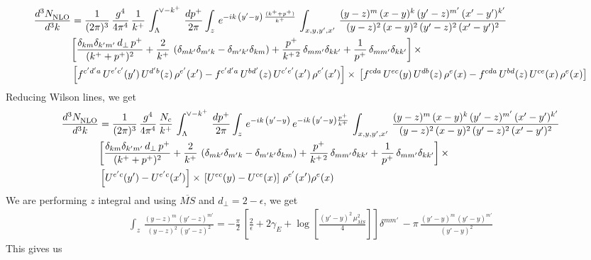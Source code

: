 \documentclass[10pt]{article}
\begin{document}
\begin{align}
     \frac{d^{3}N_{\rm NLO}^{\rm}}{d^{3}k}  & = \frac{1}{(2\pi)^{3}}\,\frac{g^{4}}{4\pi^{4}}\,\frac{1}{k^{+}}\,\int_{\Lambda}^{\vee-k^{+}}\, \frac{dp^{+}}{2\pi}\int_{z}\,e^{-ik\,\left(y'-y\right)\, \frac{(k^{+}+p^{+})}{k^{+}}}\,\int_{x,y,y^{\prime},x'}\,\frac{(y-z)^{m}\,(x-y)^{k}\,(y'-z)^{m'}\,(x'-y')^{k'}}{(y-z)^{2}\,(x-y)^{2}\,(y'-z)^{2}\,(x'-y')^{2}}\notag \\ &  \bigg[\frac{\delta_{km}\delta_{k'm'}\,d_{\perp}\,p^{+}}{(k^{+}+p^{+})^{2}}+\frac{2}{k^{+}}\,\left(\delta_{mk'}\delta_{m'k}-\delta_{m'k'}\delta_{km}\right) + \frac{p^{+}}{k^{+\,2}}\,\delta_{mm'}\delta_{kk'}+\frac{1}{p^{+}}\,\delta_{mm'}\delta_{kk'}\bigg]\,\times\,\notag \\ & \left[f^{c'd'a}\,U^{e'c'}(y')\,U^{d'b}(z)\,\rho^{e'}(x')-f^{c'd'a}\, 
    U^{bd'}(z)\,U^{c'e'}(x')\,\rho^{e'}(x')\right]\times\, \left[f^{cda}\,U^{ec}(y)\,U^{db}(z)\,\rho^{e}(x)-f^{cda}\, 
    U^{bd}(z)\,U^{ce}(x)\,\rho^{e}(x)\right]
\end{align}
Reducing Wilson lines, we get
\begin{align}
     \frac{d^{3}N_{\rm NLO}^{\rm}}{d^{3}k}  & = \frac{1}{(2\pi)^{3}}\,\frac{g^{4}}{4\pi^{4}}\,\frac{N_{c}}{k^{+}}\,\int_{\Lambda}^{\vee-k^{+}}\, \frac{dp^{+}}{2\pi}\int_{z}\,e^{-ik\,\left(y'-y\right)}\,e^{-ik\,\left(y'-y\right)\frac{p^{+}}{k^{+}}}\,\int_{x,y,y^{\prime},x'}\,\frac{(y-z)^{m}\,(x-y)^{k}\,(y'-z)^{m'}\,(x'-y')^{k'}}{(y-z)^{2}\,(x-y)^{2}\,(y'-z)^{2}\,(x'-y')^{2}}\notag \\ &  \bigg[\frac{\delta_{km}\delta_{k'm'}\,d_{\perp}\,p^{+}}{(k^{+}+p^{+})^{2}}+\frac{2}{k^{+}}\,\left(\delta_{mk'}\delta_{m'k}-\delta_{m'k'}\delta_{km}\right) + \frac{p^{+}}{k^{+\,2}}\,\delta_{mm'}\delta_{kk'}+\frac{1}{p^{+}}\,\delta_{mm'}\delta_{kk'}\bigg]\,\times\,\notag \\ & \left[U^{e'c}(y') - U^{e'c}(x')\right] \times\, \left[U^{ec}(y) - U^{ce}(x)\right]\, \rho^{e'}(x') \rho^{e}(x)
\end{align}
We are performing $z$ integral and using $\overline{MS}$ and $d_{\perp} = 2-\epsilon$, we get
\begin{align}
    \int_{z}\, \frac{(y-z)^{m}\,(y'-z)^{m'}}{(y-z)^{2}\,(y'-z)^{2}} = -\frac{\pi}{2}\, \left[\frac{2}{\epsilon} +2\gamma_{E} + \log{\left[\frac{(y'-y)^{2}\,\mu^{2}_{\overline{MS}}}{4}\right]}\right]\delta^{mm'}\, - \pi\, \frac{(y'-y)^{m}\,(y'-y)^{m'}}{(y'-y)^{2}}
\end{align}
This gives us
\end{document}
